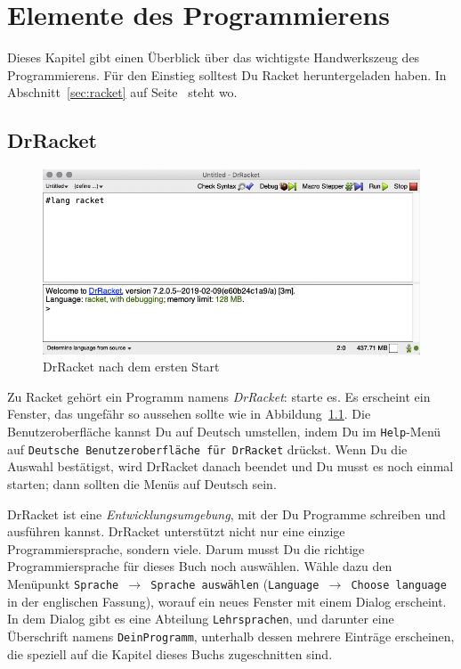 
\chapter{Elemente des Programmierens}
\label{cha:whats-programming}

Dieses Kapitel gibt einen Überblick über das wichtigste Handwerkszeug
des Programmierens.   Für den Einstieg solltest Du Racket
heruntergeladen haben.  In
Abschnitt~\ref{sec:racket} auf Seite~\pageref{sec:racket} steht wo.

\section{DrRacket}

\begin{figure}[tb]
  \centering
  \includegraphics[width=\textwidth]{elemente/drracket-start}
  \caption{DrRacket nach dem ersten Start}
  \label{fig:drracket-start}
\end{figure}

Zu Racket gehört ein Programm namens
\textit{DrRacket}: starte es.  Es erscheint ein
Fenster, das ungefähr so aussehen sollte wie in
Abbildung~\ref{fig:drracket-start}.  Die Benutzeroberfläche kannst
Du auf Deutsch umstellen, indem Du im \texttt{Help}-Menü auf \texttt{Deutsche
  Benutzeroberfläche für DrRacket} drückst.  Wenn Du die Auswahl
bestätigst, wird DrRacket danach beendet und Du musst es noch einmal
starten; dann sollten die Menüs auf Deutsch sein.

DrRacket ist eine \textit{Entwicklungsumgebung}, mit der Du Programme
schreiben und ausführen kannst.  DrRacket unterstützt nicht nur eine
einzige Programmiersprache, sondern viele.
Darum musst Du die richtige Programmiersprache für
dieses Buch noch auswählen.  Wähle dazu den Menüpunkt
\texttt{Sprache $\rightarrow$ Sprache auswählen} (\texttt{Language $\rightarrow$ Choose language} in der englischen
Fassung), worauf ein neues Fenster mit einem Dialog erscheint.
In dem Dialog gibt es eine
Abteilung \texttt{Lehrsprachen}, und darunter eine
Überschrift namens \texttt{DeinProgramm}, unterhalb dessen mehrere
Einträge erscheinen, die speziell auf die Kapitel dieses Buchs
zugeschnitten sind.

